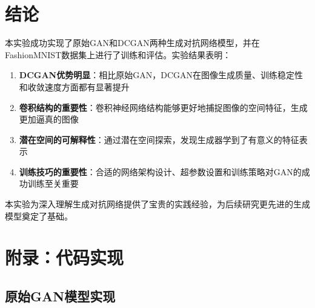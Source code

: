 \documentclass[UTF8]{ctexart}
\begin{document}
\section{结论}

本实验成功实现了原始GAN和DCGAN两种生成对抗网络模型，并在FashionMNIST数据集上进行了训练和评估。实验结果表明：

\begin{enumerate}
\item \textbf{DCGAN优势明显}：相比原始GAN，DCGAN在图像生成质量、训练稳定性和收敛速度方面都有显著提升
\item \textbf{卷积结构的重要性}：卷积神经网络结构能够更好地捕捉图像的空间特征，生成更加逼真的图像
\item \textbf{潜在空间的可解释性}：通过潜在空间探索，发现生成器学到了有意义的特征表示
\item \textbf{训练技巧的重要性}：合适的网络架构设计、超参数设置和训练策略对GAN的成功训练至关重要
\end{enumerate}

本实验为深入理解生成对抗网络提供了宝贵的实践经验，为后续研究更先进的生成模型奠定了基础。

\appendix
\section{附录：代码实现}

\subsection{原始GAN模型实现}
\end{document}
